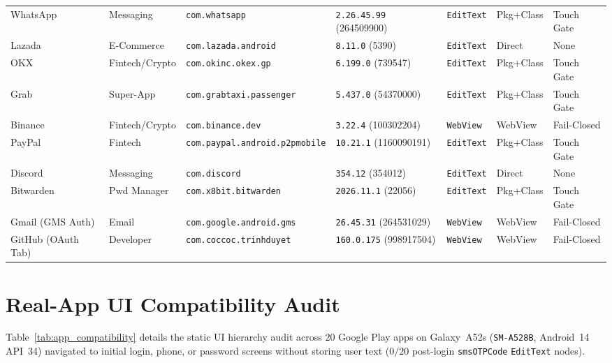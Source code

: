 \documentclass[sigconf,10pt]{acmart}
\theoremstyle{acmplain}%
\begin{document}
\begin{table}[t]
\begin{tabular*}{\textwidth}{@{\extracolsep{\fill}}lllllll@{}}
WhatsApp & Messaging & \texttt{com.whatsapp} & \texttt{2.26.45.99} (264509900) & \texttt{EditText} & Pkg+Class & Touch Gate \\
Lazada & E-Commerce & \texttt{com.lazada.android} & \texttt{8.11.0} (5390) & \texttt{EditText} & Direct & None \\
OKX & Fintech/Crypto & \texttt{com.okinc.okex.gp} & \texttt{6.199.0} (739547) & \texttt{EditText} & Pkg+Class & Touch Gate \\
Grab & Super-App & \texttt{com.grabtaxi.passenger} & \texttt{5.437.0} (54370000) & \texttt{EditText} & Pkg+Class & Touch Gate \\
Binance & Fintech/Crypto & \texttt{com.binance.dev} & \texttt{3.22.4} (100302204) & \texttt{WebView} & WebView & Fail-Closed \\
PayPal & Fintech & \texttt{com.paypal.android.p2pmobile} & \texttt{10.21.1} (1160090191) & \texttt{EditText} & Pkg+Class & Touch Gate \\
Discord & Messaging & \texttt{com.discord} & \texttt{354.12} (354012) & \texttt{EditText} & Direct & None \\
Bitwarden & Pwd Manager & \texttt{com.x8bit.bitwarden} & \texttt{2026.11.1} (22056) & \texttt{EditText} & Pkg+Class & Touch Gate \\
Gmail (GMS Auth) & Email & \texttt{com.google.android.gms} & \texttt{26.45.31} (264531029) & \texttt{WebView} & WebView & Fail-Closed \\
GitHub (OAuth Tab) & Developer & \texttt{com.coccoc.trinhduyet} & \texttt{160.0.175} (998917504) & \texttt{WebView} & WebView & Fail-Closed \\
\bottomrule
\end{tabular*}
\end{table}

\section{Real-App UI Compatibility Audit}
\label{sec:appendix_compat}

Table~\ref{tab:app_compatibility} details the static UI hierarchy audit across 20 Google Play apps on Galaxy~A52s (\texttt{SM-A528B}, Android~14 API~34) navigated to initial login, phone, or password screens without storing user text ($0/20$ post-login \texttt{smsOTPCode} \texttt{EditText} nodes).
\end{document}
